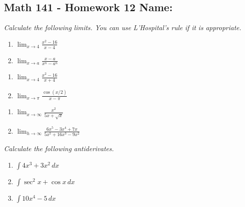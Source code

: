 \documentclass[11pt]{article}
\newcommand{\ds}{\displaystyle}
\begin{document}
\pagestyle{empty}
\subsection*{Math 141 - Homework 12 \hfill Name: \underline{\hspace*{2in}}}


\textit{Calculate the following limits. You can use L'Hospital's rule if it is appropriate.}
\begin{multicols}{2}
\begin{enumerate}
\item $\ds \lim_{x \rightarrow 4} \frac{x^2 - 16}{x-4}$
\item $\ds \lim_{x \rightarrow a} \frac{x-a}{x^n - a^n}$
\setcounter{enumCount}{\theenumi}
\end{enumerate}
\end{multicols}
\vfill

\noindent
\begin{multicols}{2}
\begin{enumerate}
\setcounter{enumi}{\theenumCount}
\item $\ds \lim_{x \rightarrow 4} \frac{x^2 - 16}{x+4}$
\item $\ds \lim_{x \rightarrow \pi} \frac{\cos(x/2)}{x-\pi}$
\setcounter{enumCount}{\theenumi}
\end{enumerate}
\end{multicols}
\vfill

\noindent
\begin{multicols}{2}
\begin{enumerate}
\setcounter{enumi}{\theenumCount}
\item $\ds \lim_{x \rightarrow \infty} \frac{x^2}{5x + \sqrt{x}}$
\item $\ds \lim_{h \rightarrow \infty} \frac{6x^5 - 3x^4 + 7x}{5x^5 + 16x^3 - 9 x^2}$
\setcounter{enumCount}{\theenumi}
\end{enumerate}
\end{multicols}
\vfill


\noindent
\textit{Calculate the following antiderivates.}

\begin{multicols}{3}
\begin{enumerate}
\setcounter{enumi}{\theenumCount}
\item $\ds \int 4x^3 + 3x^2\, dx$
\item $\ds \int \sec^2 x + \cos x\, dx$
\item $\ds \int 10x^4 - 5\, dx$
\setcounter{enumCount}{\theenumi}
\end{enumerate}
\end{multicols}
\vfill
\end{document}
